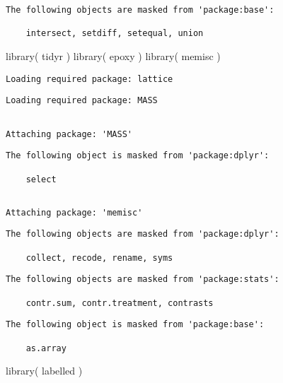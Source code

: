 \documentclass[
  letterpaper,
]{scrbook}
\newenvironment{Shaded}{\begin{snugshade}}{\end{snugshade}}
\newcommand{\FunctionTok}[1]{\textcolor[rgb]{0.28,0.35,0.67}{#1}}
\newcommand{\NormalTok}[1]{\textcolor[rgb]{0.00,0.23,0.31}{#1}}
\begin{document}
\begin{verbatim}
The following objects are masked from 'package:base':

    intersect, setdiff, setequal, union
\end{verbatim}

\begin{Shaded}
\begin{Highlighting}[]
\FunctionTok{library}\NormalTok{( tidyr )}
\FunctionTok{library}\NormalTok{( epoxy )}
\FunctionTok{library}\NormalTok{( memisc )}
\end{Highlighting}
\end{Shaded}

\begin{verbatim}
Loading required package: lattice
\end{verbatim}

\begin{verbatim}
Loading required package: MASS
\end{verbatim}

\begin{verbatim}

Attaching package: 'MASS'
\end{verbatim}

\begin{verbatim}
The following object is masked from 'package:dplyr':

    select
\end{verbatim}

\begin{verbatim}

Attaching package: 'memisc'
\end{verbatim}

\begin{verbatim}
The following objects are masked from 'package:dplyr':

    collect, recode, rename, syms
\end{verbatim}

\begin{verbatim}
The following objects are masked from 'package:stats':

    contr.sum, contr.treatment, contrasts
\end{verbatim}

\begin{verbatim}
The following object is masked from 'package:base':

    as.array
\end{verbatim}

\begin{Shaded}
\begin{Highlighting}[]
\FunctionTok{library}\NormalTok{( labelled )}
\end{Highlighting}
\end{Shaded}
\end{document}

